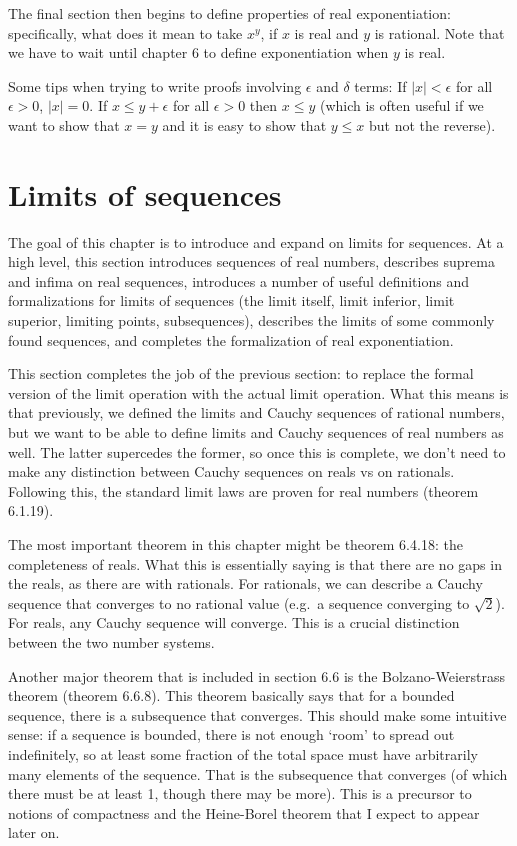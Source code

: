 \documentclass[answers,12pt]{exam}
\begin{document}
The final section then begins to define properties of real exponentiation:
specifically, what does it mean to take $x^y$, if $x$ is real and $y$ is rational.
Note that we have to wait until chapter 6 to define exponentiation when $y$ is real.

Some tips when trying to write proofs involving $\epsilon$ and $\delta$ terms:
If $|x|<\epsilon$ for all $\epsilon >0$, $|x| = 0$.
If $x \leq y + \epsilon$ for all $\epsilon > 0$ then $x \leq y$ (which is often useful if we want to show that $x=y$ and it is easy to show that $y \leq x$ but not the reverse).

\section{Limits of sequences}
The goal of this chapter is to introduce and expand on limits for sequences.
At a high level, this section introduces sequences of real numbers, describes suprema and infima on real sequences, introduces a number of useful definitions and formalizations for limits of sequences (the limit itself, limit inferior, limit superior, limiting points, subsequences), describes the limits of some commonly found sequences, and completes the formalization of real exponentiation.

This section completes the job of the previous section: to replace the formal version of the limit operation with the actual limit operation.
What this means is that previously, we defined the limits and Cauchy sequences of rational numbers, but we want to be able to define limits and Cauchy sequences of real numbers as well.
The latter supercedes the former, so once this is complete, we don't need to make any distinction between Cauchy sequences on reals vs on rationals.
Following this, the standard limit laws are proven for real numbers (theorem 6.1.19).

The most important theorem in this chapter might be theorem 6.4.18: the completeness of reals.
What this is essentially saying is that there are no gaps in the reals, as there are with rationals.
For rationals, we can describe a Cauchy sequence that converges to no rational value (e.g.\ a sequence converging to $\sqrt{2}$).
For reals, any Cauchy sequence will converge.
This is a crucial distinction between the two number systems.

Another major theorem that is included in section 6.6 is the Bolzano-Weierstrass theorem (theorem 6.6.8).
This theorem basically says that for a bounded sequence, there is a subsequence that converges.
This should make some intuitive sense: if a sequence is bounded, there is not enough `room' to spread out indefinitely, so at least some fraction of the total space must have arbitrarily many elements of the sequence.
That is the subsequence that converges (of which there must be at least 1, though there may be more).
This is a precursor to notions of compactness and the Heine-Borel theorem that I expect to appear later on.
\end{document}
